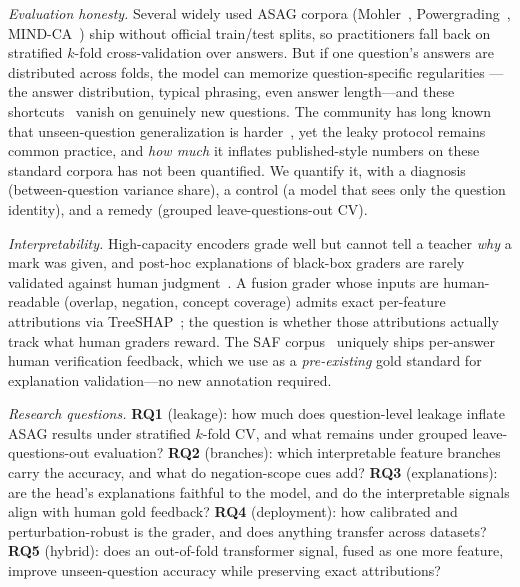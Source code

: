 \documentclass[10pt,twocolumn]{article}
\begin{document}
\textit{Evaluation honesty.} Several widely used ASAG corpora (Mohler~\cite{mohler2011learning},
Powergrading~\cite{basu2013powergrading}, MIND-CA~\cite{kovatchev2020mind}) ship
without official train/test splits, so practitioners fall back on stratified
$k$-fold cross-validation over answers. But if one question's answers are
distributed across folds, the model can memorize question-specific regularities
---the answer distribution, typical phrasing, even answer length---and these
shortcuts~\cite{geirhos2020shortcut} vanish on genuinely new questions. The
community has long known that unseen-question generalization is
harder~\cite{dzikovska2013semeval,condor2021automatic}, yet the leaky protocol
remains common practice, and \emph{how much} it inflates published-style numbers
on these standard corpora has not been quantified. We quantify it, with a
diagnosis (between-question variance share), a control (a model that sees only the
question identity), and a remedy (grouped leave-questions-out CV).

\textit{Interpretability.} High-capacity encoders grade well but cannot tell a
teacher \emph{why} a mark was given, and post-hoc explanations of black-box
graders are rarely validated against human judgment~\cite{poulton2021explaining,
tornqvist2023exasag}. A fusion grader whose inputs are human-readable (overlap,
negation, concept coverage) admits exact per-feature attributions via
TreeSHAP~\cite{lundberg2017unified,lundberg2020local}; the question is whether
those attributions actually track what human graders reward. The SAF
corpus~\cite{filighera2022your} uniquely ships per-answer human verification
feedback, which we use as a \emph{pre-existing} gold standard for explanation
validation---no new annotation required.

\textit{Research questions.}
\textbf{RQ1} (leakage): how much does question-level leakage inflate ASAG results
under stratified $k$-fold CV, and what remains under grouped leave-questions-out
evaluation? \textbf{RQ2} (branches): which interpretable feature branches carry
the accuracy, and what do negation-scope cues add? \textbf{RQ3} (explanations):
are the head's explanations faithful to the model, and do the interpretable
signals align with human gold feedback? \textbf{RQ4} (deployment): how calibrated
and perturbation-robust is the grader, and does anything transfer across datasets?
\textbf{RQ5} (hybrid): does an out-of-fold transformer signal, fused as one more
feature, improve unseen-question accuracy while preserving exact attributions?
\end{document}
